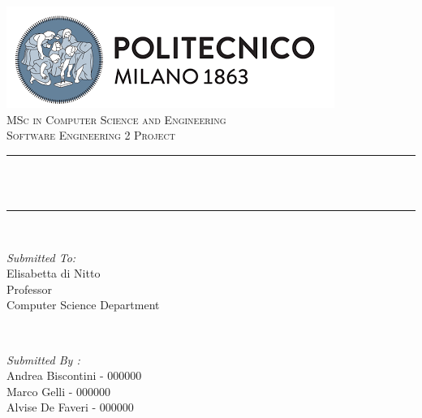 \begin{titlepage}
	\centering
    \vspace*{0.5 cm}
    \includegraphics[scale = 0.75]{Images/Polimilogo}\\[1.0 cm]	%
    \textsc{\LARGE MSc in Computer Science and Engineering}\\[2.0 cm]	%
	\textsc{\Large Software Engineering 2 Project}\\[0.5 cm]				%
	\rule{\linewidth}{0.2 mm} \\[0.4 cm]
	{ \huge \bfseries \thetitle}\\
	\rule{\linewidth}{0.2 mm} \\[1.5 cm]
	
	\begin{minipage}{0.4\textwidth}
		\begin{flushleft} \large
			\emph{Submitted To:}\\
			Elisabetta di Nitto\\
            Professor\\
            Computer Science Department\\
			\end{flushleft}
			\end{minipage}~
			\begin{minipage}{0.4\textwidth}
            
			\begin{flushright} \large
			\emph{Submitted By :} \\
			Andrea Biscontini - 000000\\
			Marco Gelli - 000000\\
			Alvise De Faveri - 000000\\
		\end{flushright}
        
	\end{minipage}\\[2 cm]
	
	
    
    
    
    
	
\end{titlepage}

